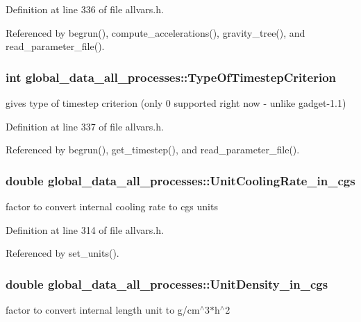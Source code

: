 Definition at line 336 of file allvars.h.



Referenced by begrun(), compute\_\-accelerations(), gravity\_\-tree(), and read\_\-parameter\_\-file().

\hypertarget{structglobal__data__all__processes_a2cc704c49ada031fae9619dbf163e32d}{
\subsubsection[{TypeOfTimestepCriterion}]{\setlength{\rightskip}{0pt plus 5cm}int {\bf global\_\-data\_\-all\_\-processes::TypeOfTimestepCriterion}}}
\label{structglobal__data__all__processes_a2cc704c49ada031fae9619dbf163e32d}
gives type of timestep criterion (only 0 supported right now -\/ unlike gadget-\/1.1) 

Definition at line 337 of file allvars.h.



Referenced by begrun(), get\_\-timestep(), and read\_\-parameter\_\-file().

\hypertarget{structglobal__data__all__processes_a79739025eb7e66065966227036437e06}{
\subsubsection[{UnitCoolingRate\_\-in\_\-cgs}]{\setlength{\rightskip}{0pt plus 5cm}double {\bf global\_\-data\_\-all\_\-processes::UnitCoolingRate\_\-in\_\-cgs}}}
\label{structglobal__data__all__processes_a79739025eb7e66065966227036437e06}
factor to convert internal cooling rate to cgs units 

Definition at line 314 of file allvars.h.



Referenced by set\_\-units().

\hypertarget{structglobal__data__all__processes_aeccb92d371d0cfbd90cc34f85c8aa25f}{
\subsubsection[{UnitDensity\_\-in\_\-cgs}]{\setlength{\rightskip}{0pt plus 5cm}double {\bf global\_\-data\_\-all\_\-processes::UnitDensity\_\-in\_\-cgs}}}
\label{structglobal__data__all__processes_aeccb92d371d0cfbd90cc34f85c8aa25f}
factor to convert internal length unit to g/cm$^\wedge$3$\ast$h$^\wedge$2 


